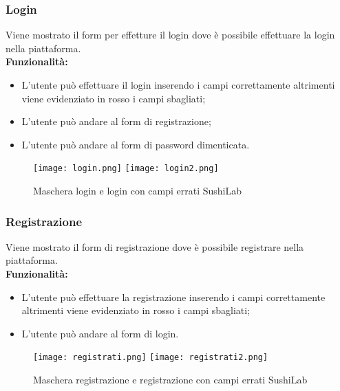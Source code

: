 \subsubsection{Login}
Viene mostrato il form per effetture il login dove è possibile effettuare la login nella piattaforma.\\
\textbf{Funzionalità:}
\begin{itemize}
    \item L'utente può effettuare il login inserendo i campi correttamente altrimenti viene evidenziato in rosso i campi sbagliati;
    \item L'utente può andare al form di registrazione;
    \item L'utente può andare al form di password dimenticata.
\end{itemize}
\begin{figure}[H]
    \centering
    \texttt{[image: login.png]}
    \texttt{[image: login2.png]}
    \caption{Maschera login e login con campi errati SushiLab}
\end{figure}
\pagebreak

\subsubsection{Registrazione}
Viene mostrato il form di registrazione dove è possibile registrare nella piattaforma.\\
\textbf{Funzionalità:}
\begin{itemize}
    \item L'utente può effettuare la registrazione inserendo i campi correttamente altrimenti viene evidenziato in rosso i campi sbagliati;
    \item L'utente può andare al form di login.
\end{itemize}
\begin{figure}[H]
    \centering
    \texttt{[image: registrati.png]}
    \texttt{[image: registrati2.png]}
    \caption{Maschera registrazione e registrazione con campi errati SushiLab}
\end{figure}
\pagebreak

